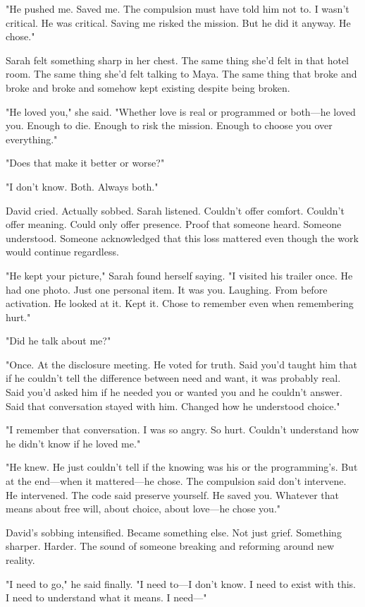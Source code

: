 "He pushed me. Saved me. The compulsion must have told him not to. I wasn't critical. He was critical. Saving me risked the mission. But he did it anyway. He chose."

Sarah felt something sharp in her chest. The same thing she'd felt in that hotel room. The same thing she'd felt talking to Maya. The same thing that broke and broke and broke and somehow kept existing despite being broken.

"He loved you," she said. "Whether love is real or programmed or both—he loved you. Enough to die. Enough to risk the mission. Enough to choose you over everything."

"Does that make it better or worse?"

"I don't know. Both. Always both."

David cried. Actually sobbed. Sarah listened. Couldn't offer comfort. Couldn't offer meaning. Could only offer presence. Proof that someone heard. Someone understood. Someone acknowledged that this loss mattered even though the work would continue regardless.

"He kept your picture," Sarah found herself saying. "I visited his trailer once. He had one photo. Just one personal item. It was you. Laughing. From before activation. He looked at it. Kept it. Chose to remember even when remembering hurt."

"Did he talk about me?"

"Once. At the disclosure meeting. He voted for truth. Said you'd taught him that if he couldn't tell the difference between need and want, it was probably real. Said you'd asked him if he needed you or wanted you and he couldn't answer. Said that conversation stayed with him. Changed how he understood choice."

"I remember that conversation. I was so angry. So hurt. Couldn't understand how he didn't know if he loved me."

"He knew. He just couldn't tell if the knowing was his or the programming's. But at the end—when it mattered—he chose. The compulsion said don't intervene. He intervened. The code said preserve yourself. He saved you. Whatever that means about free will, about choice, about love—he chose you."

David's sobbing intensified. Became something else. Not just grief. Something sharper. Harder. The sound of someone breaking and reforming around new reality.

"I need to go," he said finally. "I need to—I don't know. I need to exist with this. I need to understand what it means. I need—"

